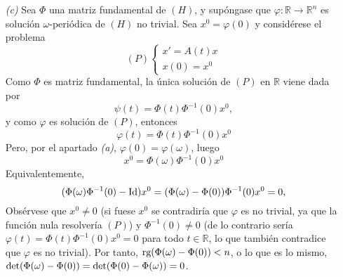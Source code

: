 \documentclass[11pt]{report}
\newcommand{\R}{\mathbb R}
\begin{document}
\begin{itemize}
    \item[\textit{(c)}] Sea $\Phi$ una matriz fundamental de $(H)$, y supóngase que $\varphi \colon \R \to \R^n$ es solución $\omega$-periódica de $(H)$ no trivial. Sea $x^0=\varphi(0)$ y considérese el problema
    \[(P) \begin{cases}
        x'=A(t)x \\
        x(0)=x^0
    \end{cases}\]
    Como $\Phi$ es matriz fundamental, la única solución de $(P)$ en $\R$ viene dada por
    \[\psi(t)=\Phi(t)\Phi^{-1}(0)x^0,\]
    y como $\varphi$ es solución de $(P)$, entonces
    \[\varphi(t)=\Phi(t)\Phi^{-1}(0)x^0\]
    Pero, por el apartado \textit{(a)}, $\varphi(0)=\varphi(\omega)$, luego
    \[x^0=\Phi(\omega)\Phi^{-1}(0)x^0\]
    Equivalentemente,
    \[(\Phi(\omega)\Phi^{-1}(0)-\textup{Id})x^0= (\Phi(\omega)-\Phi(0))\Phi^{-1}(0)x^0 =0,\]
    Obsérvese que $x^0 \neq 0$ (si fuese $x^0$ se contradiría que $\varphi$ es no trivial, ya que la función nula resolvería $(P)$) y $\Phi^{-1}(0) \neq 0$ (de lo contrario sería $\varphi(t) = \Phi(t)\Phi^{-1}(0)x^0=0$ para todo $t \in \R$, lo que también contradice que $\varphi$ es no trivial). Por tanto, $\textup{rg}(\Phi(\omega)-\Phi(0)) < n$, o lo que es lo mismo, $\textup{det}(\Phi(\omega)-\Phi(0))=\textup{det}(\Phi(0)-\Phi(\omega))=0$.

    \vspace{2mm}


\end{itemize}
\end{document}
